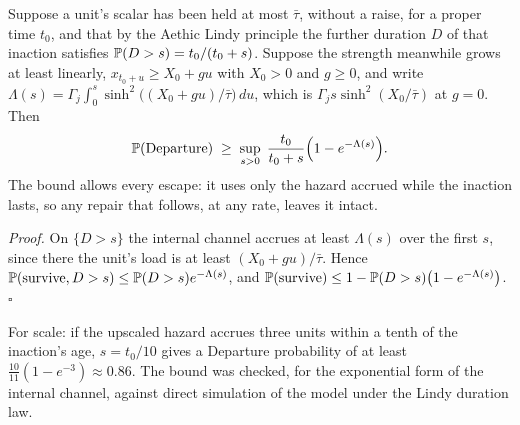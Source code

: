 \begin{corollary}
\label{gr1:cor:inaction}
Suppose a unit's scalar has been held at most $\bar\tau$, without a raise,
for a proper time $t_0$, and that by the Aethic Lindy principle the further
duration $D$ of that inaction satisfies $\mathbb{P}(D>s)=t_0/(t_0+s)$. Suppose the
strength meanwhile grows at least linearly, $x_{t_0+u}\ge X_0+gu$ with
$X_0>0$ and $g\ge0$, and write
$\Lambda(s)=\Gamma_j\int_0^s\sinh^2\big((X_0+gu)/\bar\tau\big)\,du$, which is
$\Gamma_js\sinh^2(X_0/\bar\tau)$ at $g=0$. Then
\[
\mathbb{P}(\text{Departure})\;\ge\;\sup_{s>0}\;\frac{t_0}{t_0+s}\Big(1-e^{-\Lambda(s)}\Big).
\]
The bound allows every escape: it uses only the hazard accrued while the
inaction lasts, so any repair that follows, at any rate, leaves it intact.
\end{corollary}

\noindent\emph{Proof.} On $\{D>s\}$ the internal channel accrues at least
$\Lambda(s)$ over the first $s$, since there the unit's load is at least $(X_0+gu)/\bar\tau$. Hence
$\mathbb{P}(\text{survive},D>s)\le\mathbb{P}(D>s)e^{-\Lambda(s)}$, and
$\mathbb{P}(\text{survive})\le1-\mathbb{P}(D>s)\big(1-e^{-\Lambda(s)}\big)$. $\square$

\noindent For scale: if the upscaled hazard accrues three units within a
tenth of the inaction's age, $s=t_0/10$ gives a Departure probability of at
least $\tfrac{10}{11}(1-e^{-3})\approx0.86$. The bound was checked, for the exponential form of the internal channel, against
direct simulation of the model under the Lindy duration law.

